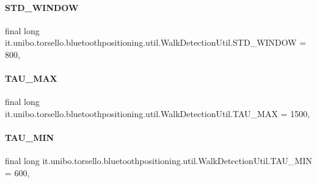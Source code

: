 \paragraph{\texorpdfstring{S\+T\+D\+\_\+\+W\+I\+N\+D\+OW}{STD\_WINDOW}}
{\footnotesize\ttfamily final long it.\+unibo.\+torsello.\+bluetoothpositioning.\+util.\+Walk\+Detection\+Util.\+S\+T\+D\+\_\+\+W\+I\+N\+D\+OW = 800\hspace{0.3cm}{\ttfamily [static]}, {\ttfamily [private]}}

\hypertarget{classit_1_1unibo_1_1torsello_1_1bluetoothpositioning_1_1util_1_1WalkDetectionUtil_a228c8fb6098bacfb92e578a1efc8e7c0_a228c8fb6098bacfb92e578a1efc8e7c0}{}\label{classit_1_1unibo_1_1torsello_1_1bluetoothpositioning_1_1util_1_1WalkDetectionUtil_a228c8fb6098bacfb92e578a1efc8e7c0_a228c8fb6098bacfb92e578a1efc8e7c0} 
\paragraph{\texorpdfstring{T\+A\+U\+\_\+\+M\+AX}{TAU\_MAX}}
{\footnotesize\ttfamily final long it.\+unibo.\+torsello.\+bluetoothpositioning.\+util.\+Walk\+Detection\+Util.\+T\+A\+U\+\_\+\+M\+AX = 1500\hspace{0.3cm}{\ttfamily [static]}, {\ttfamily [private]}}

\hypertarget{classit_1_1unibo_1_1torsello_1_1bluetoothpositioning_1_1util_1_1WalkDetectionUtil_a9f09899b6ae21b2b95de40b42dba6559_a9f09899b6ae21b2b95de40b42dba6559}{}\label{classit_1_1unibo_1_1torsello_1_1bluetoothpositioning_1_1util_1_1WalkDetectionUtil_a9f09899b6ae21b2b95de40b42dba6559_a9f09899b6ae21b2b95de40b42dba6559} 
\paragraph{\texorpdfstring{T\+A\+U\+\_\+\+M\+IN}{TAU\_MIN}}
{\footnotesize\ttfamily final long it.\+unibo.\+torsello.\+bluetoothpositioning.\+util.\+Walk\+Detection\+Util.\+T\+A\+U\+\_\+\+M\+IN = 600\hspace{0.3cm}{\ttfamily [static]}, {\ttfamily [private]}}

